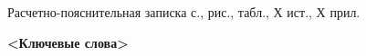 		\begin{center}
    	Расчетно-пояснительная записка \pageref{LastPage} с.,  рис.,  табл., Х ист., Х прил.
    	
		\textbf{<Ключевые слова>}
	\end{center}
\pagebreak